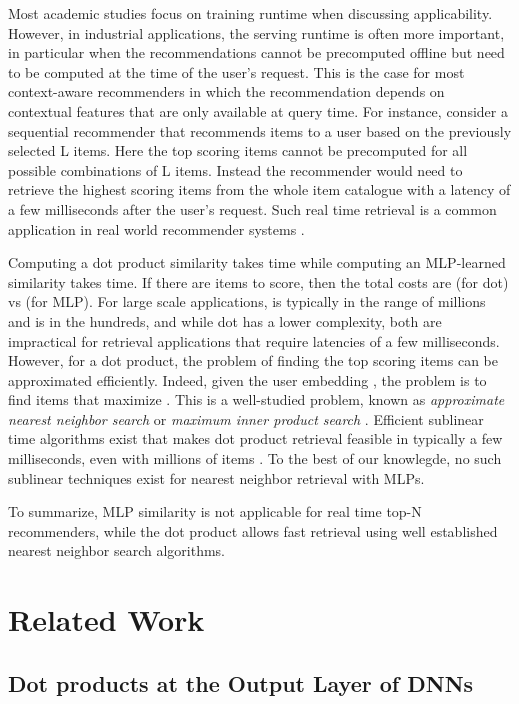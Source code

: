 \documentclass{article}
\begin{document}
Most academic studies focus on training runtime when discussing applicability.
However, in industrial applications, the serving runtime is often more important, in particular when the recommendations cannot be precomputed offline but need to be computed at the time of the user's request. This is the case for most context-aware recommenders in which the recommendation depends on contextual features that are only available at query time.
For instance, consider a sequential recommender that recommends items to a user based on the previously selected L items.
Here the top scoring items cannot be precomputed for all possible combinations of L items.
Instead the recommender would need to retrieve the highest scoring items from the  whole item catalogue with a latency of a few milliseconds after the user's request.
Such real time retrieval is a common application in real world recommender systems \cite{covington:rs16}.

Computing a dot product similarity takes  time while computing an MLP-learned similarity takes  time.
If there are  items to score, then the total costs are  (for dot) vs  (for MLP).
For large scale applications,  is typically in the range of millions and  is in the hundreds, and while dot has a lower complexity, both are impractical for retrieval applications that require latencies of a few milliseconds.
However, for a dot product, the problem of finding the top scoring items can be approximated efficiently. Indeed, given the user embedding , the problem is to find items  that maximize . This is a well-studied problem, known as \emph{approximate nearest neighbor search} \cite{liu:nips04} or \emph{maximum inner product search} \cite{shrivastava:nips14}.
Efficient sublinear time algorithms exist that makes dot product retrieval feasible in typically a few milliseconds, even with millions of items  \cite{covington:rs16}.
To the best of our knowlegde, no such sublinear techniques exist for nearest neighbor retrieval with MLPs.

To summarize, MLP similarity is not applicable for real time top-N recommenders, while the dot product allows fast retrieval using well established nearest neighbor search algorithms.


\section{Related Work}

\subsection{Dot products at the Output Layer of DNNs}
\end{document}

